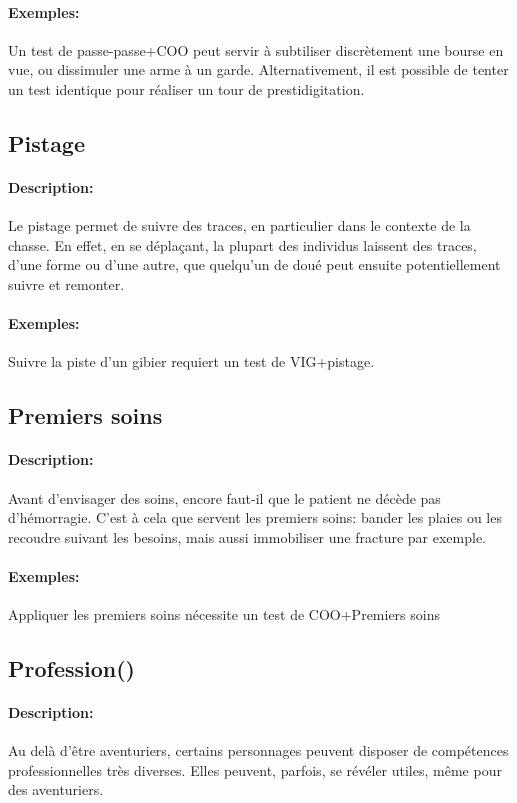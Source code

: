 \documentclass[10pt,a4paper,twocolumn]{book}
\begin{document}
\paragraph{Exemples:}Un test de passe-passe+COO peut servir à subtiliser discrètement une bourse en vue, ou dissimuler une arme à un garde. Alternativement, il est possible de tenter un test identique pour réaliser un tour de prestidigitation.
\subsection{Pistage}
\paragraph{Description:}Le pistage permet de suivre des traces, en particulier dans le contexte de la chasse. En effet, en se déplaçant, la plupart des individus laissent des traces, d'une forme ou d'une autre, que quelqu'un de doué peut ensuite potentiellement suivre et remonter.
\paragraph{Exemples:}Suivre la piste d'un gibier requiert un test de VIG+pistage.
\subsection{Premiers soins}
\paragraph{Description:}Avant d'envisager des soins, encore faut-il que le patient ne décède pas d'hémorragie. C'est à cela que servent les premiers soins: bander les plaies ou les recoudre suivant les besoins, mais aussi immobiliser une fracture par exemple.
\paragraph{Exemples:}Appliquer les premiers soins nécessite un test de COO+Premiers soins
\subsection{Profession()}
\paragraph{Description:}Au delà d'être aventuriers, certains personnages peuvent disposer de compétences professionnelles très diverses. Elles peuvent, parfois, se révéler utiles, même pour des aventuriers.
\end{document}
